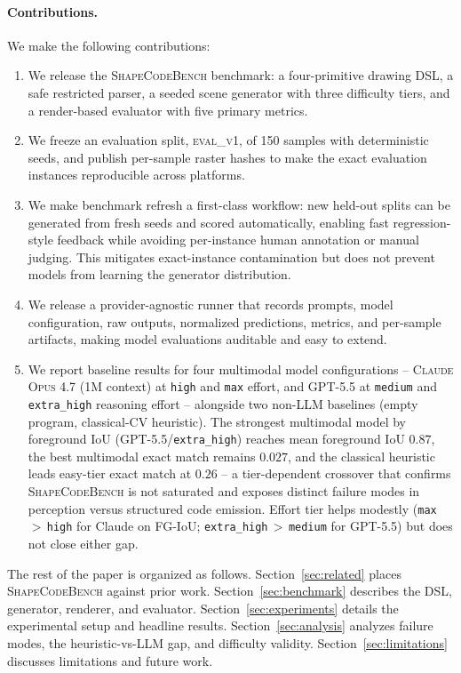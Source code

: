 \paragraph{Contributions.} We make the following contributions:
\begin{enumerate}
  \item We release the \textsc{ShapeCodeBench} benchmark: a four-primitive drawing DSL,
    a safe restricted parser, a seeded scene generator with three difficulty
    tiers, and a render-based evaluator with five primary metrics.
  \item We freeze an evaluation split, \textsc{eval\_v1}, of 150 samples with
    deterministic seeds, and publish per-sample raster hashes to make the exact
    evaluation instances reproducible across platforms.
  \item We make benchmark refresh a first-class workflow: new held-out splits can
    be generated from fresh seeds and scored automatically, enabling fast
    regression-style feedback while avoiding per-instance human annotation or
    manual judging. This mitigates exact-instance contamination but does not
    prevent models from learning the generator distribution.
  \item We release a provider-agnostic runner that records prompts, model
    configuration, raw outputs, normalized predictions, metrics, and per-sample
    artifacts, making model evaluations auditable and easy to extend.
  \item We report baseline results for four multimodal model configurations
    -- \textsc{Claude Opus 4.7} (1M context) at \texttt{high} and \texttt{max}
    effort, and \textsc{GPT-5.5} at \texttt{medium} and \texttt{extra\_high}
    reasoning effort -- alongside two non-LLM baselines (empty program,
    classical-CV heuristic). The strongest multimodal model by foreground IoU
    (\textsc{GPT-5.5}/\texttt{extra\_high}) reaches mean foreground IoU $0.87$,
    the best multimodal exact match remains $0.027$, and the classical
    heuristic leads easy-tier exact match at $0.26$ -- a
    tier-dependent crossover that confirms \textsc{ShapeCodeBench} is not saturated
    and exposes distinct failure modes in perception versus structured code
    emission. Effort tier helps modestly (\texttt{max}\,$>$\,\texttt{high} for
    Claude on FG-IoU; \texttt{extra\_high}\,$>$\,\texttt{medium} for GPT-5.5)
    but does not close either gap.
\end{enumerate}

The rest of the paper is organized as follows. Section~\ref{sec:related} places
\textsc{ShapeCodeBench} against prior work. Section~\ref{sec:benchmark} describes the
DSL, generator, renderer, and evaluator. Section~\ref{sec:experiments} details
the experimental setup and headline results. Section~\ref{sec:analysis} analyzes
failure modes, the heuristic-vs-LLM gap, and difficulty validity.
Section~\ref{sec:limitations} discusses limitations and future work.
